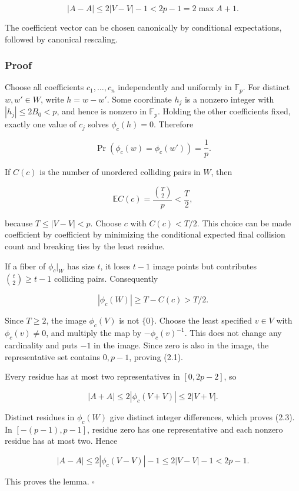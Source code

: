 \documentclass[
  10pt,
]{article}
\begin{document}
\[
|A-A|\le2|V-V|-1<2p-1=2\max A+1.
\tag{2.4}
\]

The coefficient vector can be chosen canonically by conditional
expectations, followed by canonical rescaling.

\subsubsection{Proof}\label{proof}

Choose all coefficients \(c_1,\ldots,c_n\) independently and uniformly
in \(\mathbb F_p\). For distinct \(w,w'\in W\), write \(h=w-w'\). Some
coordinate \(h_j\) is a nonzero integer with \(|h_j|\le2B_0<p\), and
hence is nonzero in \(\mathbb F_p\). Holding the other coefficients
fixed, exactly one value of \(c_j\) solves \(\phi_c(h)=0\). Therefore

\[
\Pr(\phi_c(w)=\phi_c(w'))=\frac1p.
\]

If \(C(c)\) is the number of unordered colliding pairs in \(W\), then

\[
\mathbb E C(c)=\frac{\binom T2}{p}<\frac T2,
\]

because \(T\le|V-V|<p\). Choose \(c\) with \(C(c)<T/2\). This choice can
be made coefficient by coefficient by minimizing the conditional
expected final collision count and breaking ties by the least residue.

If a fiber of \(\phi_c|_W\) has size \(t\), it loses \(t-1\) image
points but contributes \(\binom t2\ge t-1\) colliding pairs.
Consequently

\[
|\phi_c(W)|\ge T-C(c)>T/2.
\]

Since \(T\ge2\), the image \(\phi_c(V)\) is not \(\{0\}\). Choose the
least specified \(v\in V\) with \(\phi_c(v)\ne0\), and multiply the map
by \(-\phi_c(v)^{-1}\). This does not change any cardinality and puts
\(-1\) in the image. Since zero is also in the image, the representative
set contains \(0,p-1\), proving (2.1).

Every residue has at most two representatives in \([0,2p-2]\), so

\[
|A+A|\le2|\phi_c(V+V)|\le2|V+V|.
\]

Distinct residues in \(\phi_c(W)\) give distinct integer differences,
which proves (2.3). In \([-(p-1),p-1]\), residue zero has one
representative and each nonzero residue has at most two. Hence

\[
|A-A|\le2|\phi_c(V-V)|-1\le2|V-V|-1<2p-1.
\]

This proves the lemma. \(\square\)
\end{document}
